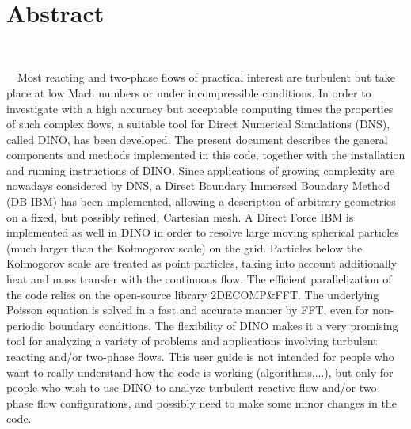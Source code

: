 \newpage
\bc \section*{Abstract}  
\ec
 Most reacting and two-phase flows of practical interest are turbulent but take place at low Mach numbers or under incompressible conditions. In order to investigate with a high accuracy but acceptable computing times the properties of such complex flows, a suitable tool for Direct Numerical Simulations (DNS), called DINO, has been developed. The present document describes the general components and methods implemented in this code, together with the installation and running instructions of DINO. Since applications of growing complexity are nowadays considered by DNS, a Direct Boundary Immersed Boundary Method (DB-IBM) has been implemented, allowing a description of arbitrary geometries on a fixed, but possibly refined, Cartesian mesh. A Direct Force IBM is implemented as well in DINO in order to resolve large moving spherical particles (much larger than the Kolmogorov scale) on the grid. Particles below the Kolmogorov scale are treated as point particles, taking into account additionally heat and mass transfer with the continuous flow. The efficient parallelization of the code relies on the open-source library 2DECOMP\&FFT. The underlying Poisson equation is solved in a fast and accurate manner by FFT, even for non-periodic boundary conditions. The flexibility of DINO makes it a very promising tool for analyzing a variety of problems and applications involving turbulent reacting and/or two-phase flows. This user guide is not intended for people who want to really understand how the code is working (algorithms,...), but only for people who wish to use DINO to analyze turbulent reactive flow and/or two-phase flow configurations, and possibly need to make some minor changes in the code.



